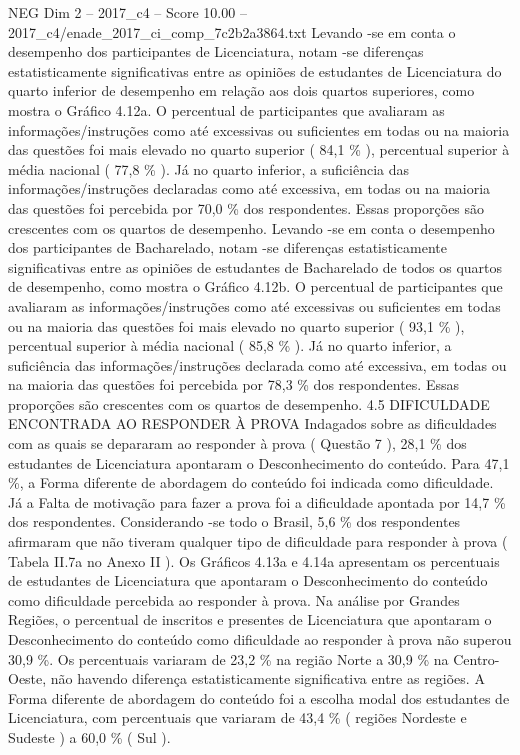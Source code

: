 \begin{textsample}{NEG Dim 2 – 2017\_c4 – Score 10.00 – 2017\_c4/enade\_2017\_ci\_comp\_7c2b2a3864.txt}
Levando -se em conta o desempenho dos participantes de Licenciatura, notam -se diferenças estatisticamente significativas entre as opiniões de estudantes de Licenciatura do quarto inferior de desempenho em relação aos dois quartos superiores, como mostra o Gráfico 4.12a.
O percentual de participantes que avaliaram as informações/instruções como até excessivas ou suficientes em todas ou na maioria das questões foi mais elevado no quarto superior ( 84,1 \% ), percentual superior à média nacional ( 77,8 \% ).
Já no quarto inferior, a suficiência das informações/instruções declaradas como até excessiva, em todas ou na maioria das questões foi percebida por 70,0 \% dos respondentes.
Essas proporções são crescentes com os quartos de desempenho.
Levando -se em conta o desempenho dos participantes de Bacharelado, notam -se diferenças estatisticamente significativas entre as opiniões de estudantes de Bacharelado de todos os quartos de desempenho, como mostra o Gráfico 4.12b.
O percentual de participantes que avaliaram as informações/instruções como até excessivas ou suficientes em todas ou na maioria das questões foi mais elevado no quarto superior ( 93,1 \% ), percentual superior à média nacional ( 85,8 \% ).
Já no quarto inferior, a suficiência das informações/instruções declarada como até excessiva, em todas ou na maioria das questões foi percebida por 78,3 \% dos respondentes.
Essas proporções são crescentes com os quartos de desempenho. 4.5 DIFICULDADE ENCONTRADA AO RESPONDER À PROVA Indagados sobre as dificuldades com as quais se depararam ao responder à prova ( Questão 7 ), 28,1 \% dos estudantes de Licenciatura apontaram o Desconhecimento do conteúdo.
Para 47,1 \%, a Forma diferente de abordagem do conteúdo foi indicada como dificuldade.
Já a Falta de motivação para fazer a prova foi a dificuldade apontada por 14,7 \% dos respondentes.
Considerando -se todo o Brasil, 5,6 \% dos respondentes afirmaram que não tiveram qualquer tipo de dificuldade para responder à prova ( Tabela II.7a no Anexo II ).
Os Gráficos 4.13a e 4.14a apresentam os percentuais de estudantes de Licenciatura que apontaram o Desconhecimento do conteúdo como dificuldade percebida ao responder à prova.
Na análise por Grandes Regiões, o percentual de inscritos e presentes de Licenciatura que apontaram o Desconhecimento do conteúdo como dificuldade ao responder à prova não superou 30,9 \%.
Os percentuais variaram de 23,2 \% na região Norte a 30,9 \% na Centro-Oeste, não havendo diferença estatisticamente significativa entre as regiões.
A Forma diferente de abordagem do conteúdo foi a escolha modal dos estudantes de Licenciatura, com percentuais que variaram de 43,4 \% ( regiões Nordeste e Sudeste ) a 60,0 \% ( Sul ).

\end{textsample}
